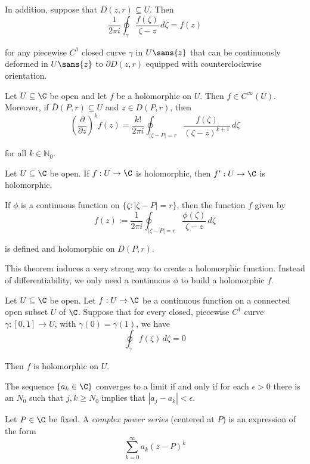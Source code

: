 In addition, suppose that $\overline D(z,r)\subseteq U$. Then
$$
  \frac1{2\pi i}\oint_\gamma\frac{f(\zeta)}{\zeta-z}\,d\zeta=f(z)
$$

for any piecewise $C^1$ closed curve $\gamma$ in $U\sans{z}$ that can be
continuously deformed in $U\sans{z}$ to $\partial D(z,r)$ equipped with
counterclockwise orientation.

\label{e20a4ed}

Let $U\subseteq\C$ be open and let $f$ be a holomorphic on $U$. Then $f\in
C^\infty(U)$. Moreover, if $\overline D(P,r)\subseteq U$ and $z\in D(P,r)$,
then
$$
  \left(\frac\partial{\partial z}\right)^kf(z)=\frac{k!}{2\pi i}
  \oint_{|\zeta-P|=r}\frac{f(\zeta)}{(\zeta-z)^{k+1}}\,d\zeta
$$

for all $k\in\mathbb{N}_0$.

\label{ee189cf}

Let $U\subseteq\C$ be open. If $f:U\to\C$ is holomorphic, then $f':U\to\C$ is
holomorphic.

\label{c056da0}

If $\phi$ is a continuous function on $\{\zeta:|\zeta-P|=r\}$, then the
function $f$ given by
$$
  f(z):=\frac1{2\pi i}\oint_{|\zeta-P|=r}\frac{\phi(\zeta)}{\zeta-z}\,d\zeta
$$

is defined and holomorphic on $D(P,r)$.

This theorem induces a very strong way to create a holomorphic function.
Instead of differentiability, we only need a continuous $\phi$ to build a
holomorphic $f$.

\label{f378992}

Let $U\subseteq\C$ be open. Let $f:U\to\C$ be a continuous function on a
connected open subset $U$ of $\C$. Suppose that for every closed, piecewise
$C^1$ curve $\gamma:[0,1]\to U$, with $\gamma(0)=\gamma(1)$, we have
$$\oint_\gamma f(\zeta)\,d\zeta=0$$

Then $f$ is holomorphic on $U$.

\label{db44655}

The sequence $\{a_k\in\C\}$ converges to a limit if and only if for each
$\epsilon>0$ there is an $N_0$ such that $j,k\geq N_0$ implies that
$|a_j-a_k|<\epsilon$.

\label{b9a7c59}

Let $P\in\C$ be fixed. A \textit{complex power series} (centered at $P$) is an
expression of the form
$$
  \sum_{k=0}^\infty a_k(z-P)^k
$$

